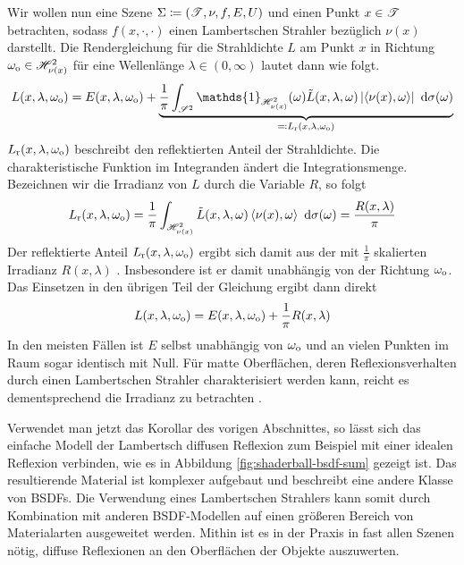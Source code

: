 		Wir wollen nun eine Szene $\Sigma\coloneqq(\mathscr{T},\nu,f,E,U)$ und einen Punkt $x\in\mathscr{T}$ betrachten, sodass $f(x,\cdot,\cdot)$ einen Lambertschen Strahler bezüglich $\nu(x)$ darstellt.
		Die Rendergleichung für die Strahldichte $L$ am Punkt $x$ in Richtung $\omega_{\mathrm{o}}\in\mathscr{H}^{2}_{\nu(x)}$ für eine Wellenlänge $\lambda\in(0,\infty)$ lautet dann wie folgt.
		\[
			L(x,\lambda,\omega_\m{o}) = E(x,\lambda,\omega_\m{o}) + \underbrace{\frac{1}{\pi} \integral{\ssp}{}{\mathds{1}_{\shs{\nu(x)}}(\omega) \tilde{L}(x,\lambda,\omega) \abs{\dotp{\nu(x)}{\omega}} }{\sigma(\omega)}}_{\definedby L_\m{r}(x,\lambda,\omega_\m{o})}
		\]
		$L_{\mathrm{r}}(x,\lambda,\omega_{\mathrm{o}})$ beschreibt den reflektierten Anteil der Strahldichte.
		Die charakteristische Funktion im Integranden ändert die Integrationsmenge.
		Bezeichnen wir die Irradianz von $L$ durch die Variable $R$, so folgt
		\[
			L_{\mathrm{r}}(x,\lambda,\omega_{\mathrm{o}}) = \frac{1}{\pi} \int_{\mathscr{H}^{2}_{\nu(x)}}^{} \tilde{L}(x,\lambda,\omega) \left\langle \nu(x),\omega \right\rangle\ \mathrm{d} \sigma(\omega) = \frac{R(x,\lambda)}{\pi}
		\]
		Der reflektierte Anteil $L_{\mathrm{r}}(x,\lambda,\omega_{\mathrm{o}})$ ergibt sich damit aus der mit $\frac{1}{\pi}$ skalierten Irradianz $R(x,\lambda)$ \cite[S.~785~f]{pbrt2}.
		Insbesondere ist er damit unabhängig von der Richtung $\omega_{\mathrm{o}}$.
		Das Einsetzen in den übrigen Teil der Gleichung ergibt dann direkt
		\[
			L(x,\lambda,\omega_{\mathrm{o}}) = E(x,\lambda,\omega_{\mathrm{o}}) + \frac{1}{\pi}R(x,\lambda)
		\]
		In den meisten Fällen ist $E$ selbst unabhängig von $\omega_{\mathrm{o}}$ und an vielen Punkten im Raum sogar identisch mit Null.
		Für matte Oberflächen, deren Reflexionsverhalten durch einen Lambertschen Strahler charakterisiert werden kann, reicht es dementsprechend die Irradianz zu betrachten \cite{irr-grad,irradiance-caching}.

		Verwendet man jetzt das Korollar des vorigen Abschnittes, so lässt sich das einfache Modell der Lambertsch diffusen Reflexion zum Beispiel mit einer idealen Reflexion verbinden, wie es in Abbildung \ref{fig:shaderball-bsdf-sum} gezeigt ist.
		Das resultierende Material ist komplexer aufgebaut und beschreibt eine andere Klasse von BSDFs.
		Die Verwendung eines Lambertschen Strahlers kann somit durch Kombination mit anderen BSDF-Modellen auf einen größeren Bereich von Materialarten ausgeweitet werden.
		Mithin ist es in der Praxis in fast allen Szenen nötig, diffuse Reflexionen an den Oberflächen der Objekte auszuwerten.

